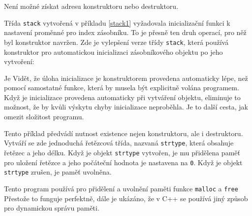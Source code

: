 {      Není možné získat adresu konstruktoru nebo destruktoru.
      \begin{example}
        Třída \lstinline[basicstyle=\ttfamily]!stack! vytvořená v příkladu \ref{stack1} vyžadovala 
        inicializační funkci k nastavení proměnné pro index zásobníku. To je přesně ten druh 
        operací, pro něž byl konstruktor navržen. Zde je vylepšení verze třídy 
        \lstinline[basicstyle=\ttfamily]!stack!, která používá konstruktor pro automatickou 
        inicializaci zásobníkového objektu po jeho vytvoření:
        
        Je Vidět, že úloha inicializace je konstruktorem provedena automaticky lépe, než pomocí 
        samostatné funkce, která by musela být explicitně volána programem. Když je inicializace 
        provedena automaticky při vytváření objektu, eliminuje to možnost, že by kvůli výskytu 
        chyby inicializace neproběhla. Je to další cesta, jak omezit složitost programu.
      \end{example}
      \begin{example}
        Tento příklad předvádí nutnost existence nejen konstruktoru, ale i destruktoru. Vytváří se 
        zde jednoduchá řetězcová třída, nazvaná \lstinline[basicstyle=\ttfamily]!strtype!, která 
        obsahuje řetězec a jeho délku. Když je objekt \lstinline[basicstyle=\ttfamily]!strtype! 
        vytvořen, je mu přidělena paměť pro uložení řetězce a jeho počáteční hodnota je nastavena 
        na \lstinline[basicstyle=\ttfamily]!0!. Když je objekt     
        \lstinline[basicstyle=\ttfamily]!strtype! zrušen, je paměť uvolněna.
        
      \end{example}
      Tento program používá pro přidělení a uvolnění paměti funkce 
      \lstinline[basicstyle=\ttfamily]!malloc! a \lstinline[basicstyle=\ttfamily]!free! Přestože to 
      funguje perfektně, dále je ukázáno, že v C++ se používá jiný způsob pro dynamickou správu 
      paměti.   

} %
\printbibliography[title={Seznam literatury}, heading=subbibliography]
